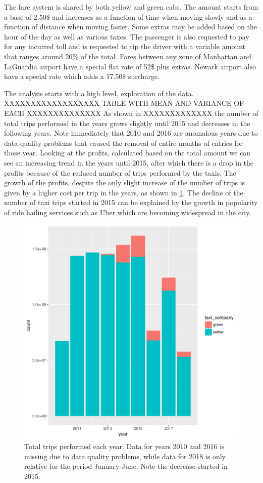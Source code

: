\documentclass{acm_proc_article-sp-sigmod09}
\begin{document}
The fare system is shared by both yellow and green cabs. The amount starts from a base of 2.50\$ and increases as a function of time when moving slowly and as a function of distance when moving faster. Some extras may be added based on the hour of the day as well as various taxes. The passenger is also requested to pay for any incurred toll and is requested to tip the driver with a variable amount that ranges around 20\% of the total. Fares between any zone of Manhattan and LaGuardia airport have a special flat rate of 52\$ plus extras. Newark airport also havs a special rate which adds a 17.50\$ surcharge.

The analysis starts with a high level, exploration of the data.  XXXXXXXXXXXXXXXXXX TABLE WITH MEAN AND VARIANCE OF EACH XXXXXXXXXXXXXX As shown in XXXXXXXXXXXXX the number of total trips performed in the years grows slightly until 2015 and decreases in the following years. Note immediately that 2010 and 2016 are anomalous years due to data quality problems that caused the removal of entire months of entries for those year. Looking at the profits, calculated based on the total amount we can see an increasing trend in the years until 2015, after which there is a drop in the profits because of the reduced number of trips performed by the taxis. The growth of the profits, despite the only slight increase of the number of trips is given by a higher cost per trip in the years, as shown in \cref{fig:travelsByYear}. The decline of the number of taxi trips started in 2015 can be explained by the growth in popularity of ride hailing services such as Uber which are becoming widespread in the city.

\begin{figure}
	\centering
	\includegraphics[width=1\columnwidth]{resources/base_plots/travels_by_year.pdf}
	\caption{Total trips performed each year. Data for years 2010 and 2016 is missing due to data quality problems, while data for 2018 is only relative for the period January-June. Note the decrease started in 2015.}
	\label{fig:travelsByYear}
\end{figure}
\end{document}
